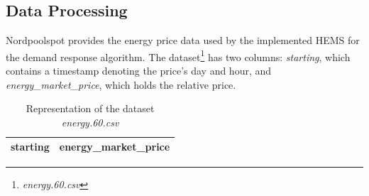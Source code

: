 \subsection{Data Processing}
Nordpoolspot \cite{nordpool} provides the energy price data used by the implemented HEMS for the demand response algorithm. The dataset\footnote{\textit{energy.60.csv}} has two columns: \textit{starting}, which contains a timestamp denoting the price's day and hour, and \textit{energy\_market\_price}, which holds the relative price.
\begin{table}[H]
\centering
\begin{tabular}{|c|c|}
\hline
\textbf{starting} & \textbf{energy\_market\_price} \\ \hline
\end{tabular}
\caption{Representation of the dataset \textit{energy.60.csv}}
\label{tab:dataset_energy_60}
\end{table}

